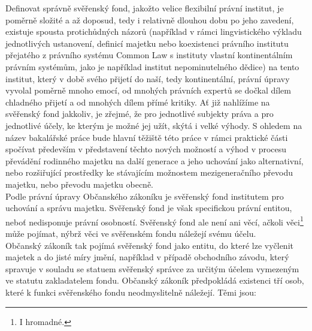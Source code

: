 \documentclass{article}
\begin{document}
Definovat správně svěřenský fond, jakožto velice flexibilní právní institut, je poměrně složité a až doposud, tedy i relativně dlouhou dobu po jeho zavedení, existuje spousta protichůdných názorů (například v rámci lingvistického výkladu jednotlivých ustanovení, definicí majetku nebo koexistenci právního institutu přejatého z právního systému Common Law s instituty vlastní kontinentálním právním systémům, jako je například institut nepominutelného dědice) na tento institut, který v době svého přijetí do naší, tedy kontinentální, právní úpravy vyvolal poměrně mnoho emocí, od mnohých právních expertů se dočkal dílem chladného přijetí a od mnohých dílem přímé kritiky. Ať již nahlížíme na svěřenský fond jakkoliv, je zřejmé, že pro jednotlivé subjekty práva a pro jednotlivé účely, ke kterým je možné jej užít, skýtá i velké výhody. S ohledem na název bakalářské práce bude hlavní těžiště této práce v rámci praktické části spočívat především v představení těchto nových možností a výhod v procesu převádění rodinného majetku na další generace a jeho uchování jako alternativní, nebo rozšiřující prostředky ke stávajícím možnostem mezigeneračního převodu majetku, nebo převodu majetku obecně. \\

Podle právní úpravy Občanského zákoníku je svěřenský fond institutem pro uchování a správu majetku. Svěřenský fond je však specifickou právní entitou, neboť nedisponuje právní osobností. Svěřenský fond ale není ani věcí, ačkoli věci\footnote{I hromadné.} může pojímat, nýbrž věci ve svěřenském fondu náležejí svému účelu.\\

Občanský zákoník tak pojímá svěřenský fond jako entitu, do které lze vyčlenit majetek a do jisté míry  jmění, například v případě obchodního závodu, který spravuje v souladu se statuem svěřenský správce za určitým účelem vymezeným ve statutu zakladatelem fondu. Občanský zákoník předpokládá existenci tří osob, které k funkci svěřenského fondu neodmyslitelně náležejí. Těmi jsou:\\
\end{document}
